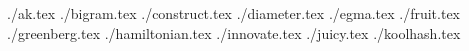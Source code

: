 \documentclass[11pt,letterpaper,oneside]{article}
\newcommand{\importproblem}[2]{{./#2.tex}}
\begin{document}
\importproblem{a}{ak}
\importproblem{b}{bigram}
\importproblem{c}{construct}
\importproblem{d}{diameter}
\importproblem{e}{egma}
\importproblem{f}{fruit}
\importproblem{g}{greenberg}
\importproblem{h}{hamiltonian}
\importproblem{i}{innovate}
\importproblem{j}{juicy}
\importproblem{k}{koolhash}
\end{document}
